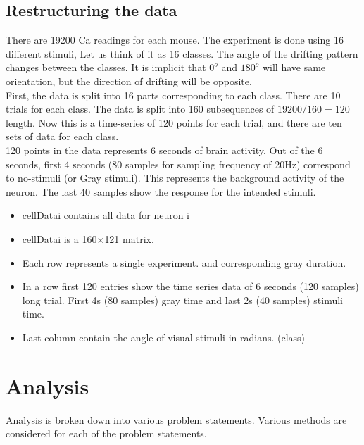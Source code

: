 \documentclass[11pt]{article}
\begin{document}
\subsection{Restructuring the data} %
\label{sub:restructuring_the_data}
There are 19200 Ca readings for each mouse. The experiment is done using 16 different stimuli, Let us think of it as 16 classes. The angle of the drifting pattern changes between the classes. It is implicit that $0^{o}$ and $180^{o}$ will have same orientation, but the direction of drifting will be opposite.\\
First, the data is split into 16 parts corresponding to each class. There are 10 trials for each class. The data is split into 160 subsequences of $19200/160 = 120$ length. Now this is a time-series of 120 points for each trial, and there are ten sets of data for each class.\\
120 points in the data represents 6 seconds of brain activity. Out of the 6 seconds, first 4 seconds (80 samples for sampling frequency of 20Hz) correspond to no-stimuli (or Gray stimuli). This represents the background activity of the neuron. The last 40 samples show the response for the intended stimuli.
\begin{itemize}
    \item cellData{i} contains all data for neuron i
    \item cellData{i} is a 160$\times$121 matrix.
    \item Each row represents a single experiment. and corresponding gray duration.
    \item In a row first 120 entries show the time series data of 6 seconds (120 samples) long trial. First 4s (80 samples) gray time and last 2s (40 samples) stimuli time.
    \item Last column contain the angle of visual stimuli in radians. (class)
\end{itemize}


\section{Analysis} %
\label{sec:analysis}
Analysis is broken down into various problem statements. Various methods are considered for each of the problem statements.
\end{document}
